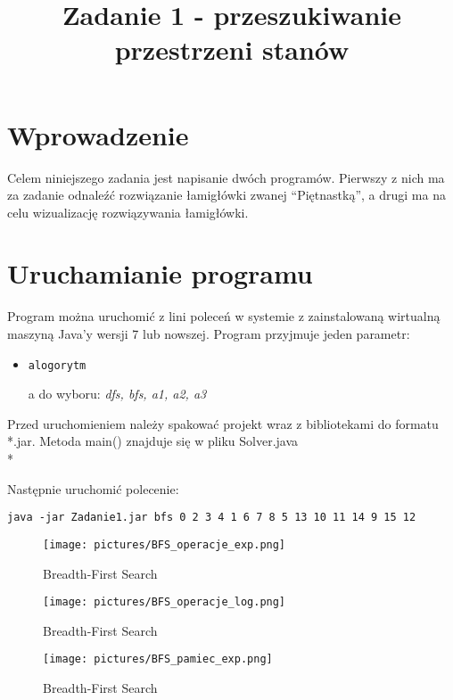 \documentclass{classrep}
\author{
  \studentinfo{Łukasz Ochmański}{183566} \and
  \studentinfo{Przemysław Szwajkowski}{173524}
}
\title{Zadanie 1 - przeszukiwanie przestrzeni stanów}
\begin{document}
\maketitle


\section{Wprowadzenie}
Celem niniejszego zadania jest napisanie dwóch programów. Pierwszy z nich ma za zadanie odnaleźć rozwiązanie łamigłówki zwanej ``Piętnastką'', a drugi ma na celu wizualizację rozwiązywania łamigłówki.

\section{Uruchamianie programu}
Program można uruchomić z lini poleceń w systemie z zainstalowaną wirtualną maszyną Java'y wersji 7 lub nowszej. Program przyjmuje jeden parametr:

\begin{itemize}
  \item \begin{verbatim}alogorytm\end{verbatim} a do wyboru: \emph{dfs, bfs, a1, a2, a3}
\end{itemize}

Przed uruchomieniem należy spakować projekt wraz z bibliotekami do formatu *.jar.
Metoda main() znajduje się w pliku Solver.java
\\*

Następnie uruchomić polecenie:

\begin{verbatim}
java -jar Zadanie1.jar bfs 0 2 3 4 1 6 7 8 5 13 10 11 14 9 15 12
\end{verbatim}

\begin{figure}[ht]
\centering
			\texttt{[image: pictures/BFS\_operacje\_exp.png]}
	\caption{Breadth-First Search}
	\label{fig:Breadth-First Search}
\end{figure}

\begin{figure}[ht]
\centering
			\texttt{[image: pictures/BFS\_operacje\_log.png]}
	\caption{Breadth-First Search}
	\label{fig:Breadth-First Search}
\end{figure}

\begin{figure}[ht]
\centering
			\texttt{[image: pictures/BFS\_pamiec\_exp.png]}
	\caption{Breadth-First Search}
	\label{fig:Breadth-First Search}
\end{figure}
\end{document}
